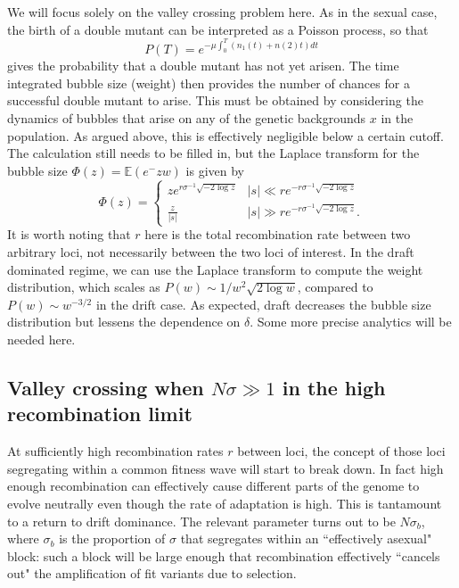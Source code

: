 \documentclass[10pt]{revtex4}
\begin{document}
We will focus solely on the valley crossing problem here.
As in the sexual case, the birth of a double mutant can be interpreted as a Poisson process, so that
\begin{equation}
P(T) = e^{-\mu \int_0^T (n_1(t) + n(2)t) dt}
\end{equation}
gives the probability that a double mutant has not yet arisen.
The time integrated bubble size (weight) then provides the number of chances for a successful double mutant to arise.
This must be obtained by considering the dynamics of bubbles that arise on any of the genetic backgrounds $x$ in the population.
As argued above, this is effectively negligible below a certain cutoff.
The calculation still needs to be filled in, but the Laplace transform for the bubble size $\Phi(z) = \mathbb{E}(e^-zw)$ is given by
\begin{equation}
\Phi(z) =
\begin{cases}
ze^{r\sigma^{-1}\sqrt{-2\log z}} &|s| \ll re^{-r\sigma^{-1}\sqrt{-2\log z}} \\
\frac{z}{|s|} &|s| \gg re^{-r\sigma^{-1}\sqrt{-2\log z}}.
\end{cases}
\end{equation}
It is worth noting that $r$ here is the total recombination rate between two arbitrary loci, not necessarily between the two loci of interest.
In the draft dominated regime, we can use the Laplace transform to compute the weight distribution, which scales as $P(w)\sim 1/w^2 \sqrt{2\log w}$, compared to $P(w) \sim w^{-3/2}$ in the drift case.
As expected, draft decreases the bubble size distribution but lessens the dependence on $\delta$.
Some more precise analytics will be needed here.

\subsection{Valley crossing when $N\sigma \gg 1$ in the high recombination limit}

At sufficiently high recombination rates $r$ between loci, the concept of those loci segregating within a common fitness wave will start to break down.
In fact high enough recombination can effectively cause different parts of the genome to evolve neutrally even though the rate of adaptation is high.
This is tantamount to a return to drift dominance.
The relevant parameter turns out to be $N\sigma_b$, where $\sigma_b$ is the proportion of $\sigma$ that segregates within an ``effectively asexual" block: such a block will be large enough that recombination effectively ``cancels out" the amplification of fit variants due to selection.
\end{document}
